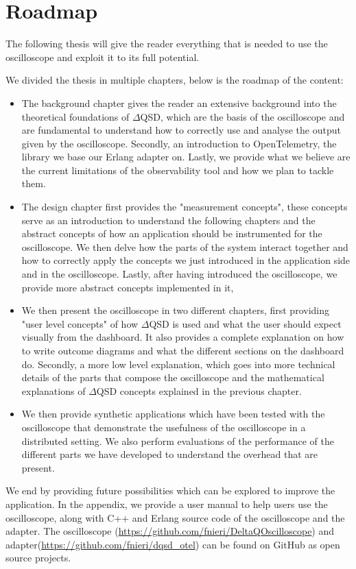 \section{Roadmap}
    The following thesis will give the reader everything that is needed to use the oscilloscope and exploit it to its full potential.

    We divided the thesis in multiple chapters, below is the roadmap of the content:
    \begin{itemize}
        \item The background chapter gives the reader an extensive background into the theoretical foundations of $\Delta$QSD, which are the basis of the oscilloscope and are fundamental to understand how to correctly use and analyse the output given by the oscilloscope. Secondly, an introduction to OpenTelemetry, the library we base our Erlang adapter on. Lastly, we provide what we believe are the current limitations of the observability tool and how we plan to tackle them.
        \item The design chapter first provides the "measurement concepts", these concepts serve as an introduction to understand the following chapters and the abstract concepts of how an application should be instrumented for the oscilloscope. We then delve how the parts of the system interact together and how to correctly apply the concepts we just introduced in the application side and in the oscilloscope. Lastly, after having introduced the oscilloscope, we provide more abstract concepts implemented in it,
        \item We then present the oscilloscope in two different chapters, first providing "user level concepts" of how $\Delta$QSD is used and what the user should expect visually from the dashboard. It also provides a complete explanation on how to write outcome diagrams and what the different sections on the dashboard do.
            Secondly, a more low level explanation, which goes into more technical details of the parts that compose the oscilloscope and the mathematical explanations of $\Delta$QSD concepts explained in the previous chapter.
        \item We then provide synthetic applications which have been tested with the oscilloscope that demonstrate the usefulness of the oscilloscope in a distributed setting. We also perform evaluations of the performance of the different parts we have developed to understand the overhead that are present.
    \end{itemize}

    We end by providing future possibilities which can be explored to improve the application.    In the appendix, we provide a user manual to help users use the oscilloscope, along with C++ and Erlang source code of the oscilloscope and the adapter.
   \sloppy The oscilloscope (\url{https://github.com/fnieri/DeltaQOscilloscope}) and adapter(\url{https://github.com/fnieri/dqsd_otel}) can be found on GitHub as open source projects.
